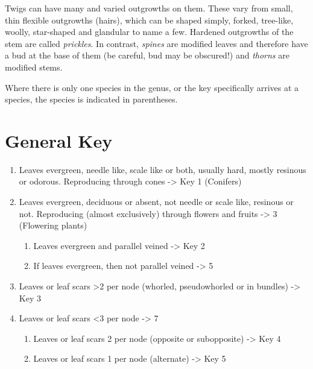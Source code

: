 \documentclass[openany]{book}
\providecommand{\tightlist}{%
  \setlength{\itemsep}{0pt}\setlength{\parskip}{0pt}}
\begin{document}
Twigs can have many and varied outgrowths on them. These vary from
small, thin flexible outgrowths (hairs), which can be shaped simply,
forked, tree-like, woolly, star-shaped and glandular to name a few.
Hardened outgrowths of the stem are called \emph{prickles}. In contrast,
\emph{spines} are modified leaves and therefore have a bud at the base
of them (be careful, bud may be obscured!) and \emph{thorns} are
modified stems.

Where there is only one species in the genus, or the key specifically
arrives at a species, the species is indicated in parentheses.

\hypertarget{general-key}{%
\chapter*{General Key}\label{general-key}}

\begin{enumerate}
\def\labelenumi{\arabic{enumi}.}
\item
  Leaves evergreen, needle like, scale like or both, usually hard,
  mostly resinous or odorous. Reproducing through cones -\textgreater{}
  Key 1 (Conifers)
\item
  Leaves evergreen, deciduous or absent, not needle or scale like,
  resinous or not. Reproducing (almost exclusively) through flowers and
  fruits -\textgreater{} 3 (Flowering plants)

  \begin{enumerate}
  \def\labelenumii{\arabic{enumii}.}
  \setcounter{enumii}{2}
  \tightlist
  \item
    Leaves evergreen and parallel veined -\textgreater{} Key 2
  \item
    If leaves evergreen, then not parallel veined -\textgreater{} 5
  \end{enumerate}
\item
  Leaves or leaf scars \textgreater{}2 per node (whorled, pseudowhorled
  or in bundles) -\textgreater{} Key 3
\item
  Leaves or leaf scars \textless{}3 per node -\textgreater{} 7

  \begin{enumerate}
  \def\labelenumii{\arabic{enumii}.}
  \setcounter{enumii}{6}
  \tightlist
  \item
    Leaves or leaf scars 2 per node (opposite or subopposite)
    -\textgreater{} Key 4
  \item
    Leaves or leaf scars 1 per node (alternate) -\textgreater{} Key 5
  \end{enumerate}
\end{enumerate}
\end{document}
